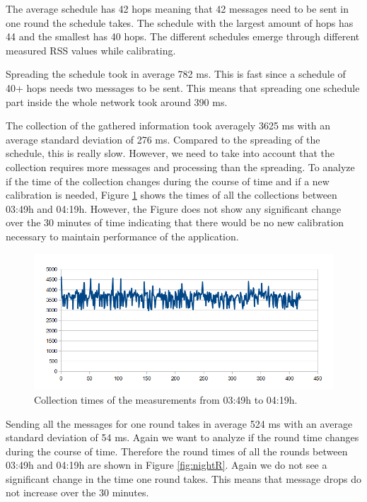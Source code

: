 The average schedule has 42 hops meaning that 42 messages need to be sent in one round the schedule takes. The schedule with the largest amount of hops has 44 and the smallest has 40 hops. The different schedules emerge through different measured RSS values while calibrating.

Spreading the schedule took in average 782 ms. This is fast since a schedule of 40+ hops needs two messages to be sent. This means that spreading one schedule part inside the whole network took around 390 ms.

The collection of the gathered information took averagely 3625 ms with an average standard deviation of 276 ms. Compared to the spreading of the schedule, this is really slow. However, we need to take into account that the collection requires more messages and processing than the spreading. To analyze if the time of the collection changes during the course of time and if a new calibration is needed, Figure \ref{fig:nightC} shows the times of all the collections between 03:49h and 04:19h. However, the Figure does not show any significant change over the 30 minutes of time indicating that there would be no new calibration necessary to maintain performance of the application.

\begin{figure}[htbp]
	\centering         
    \includegraphics[scale=0.5]{content/images/Experiment/NightCollection}
    \caption{Collection times of the measurements from 03:49h to 04:19h.}
	\label{fig:nightC}
\end{figure}

Sending all the messages for one round takes in average 524 ms with an average standard deviation of 54 ms. Again we want to analyze if the round time changes during the course of time. Therefore the round times of all the rounds between 03:49h and 04:19h are shown in Figure \ref{fig:nightR}. Again we do not see a significant change in the time one round takes. This means that message drops do not increase over the 30 minutes.

